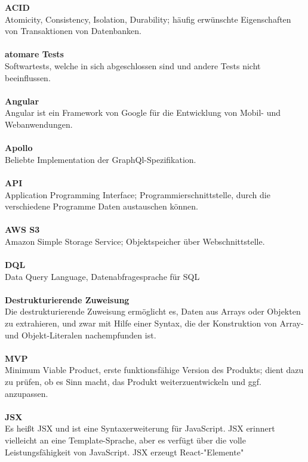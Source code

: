 \textbf{ACID}\\
Atomicity, Consistency, Isolation, Durability; häufig erwünschte Eigenschaften von Transaktionen von Datenbanken.
\\\\
\textbf{atomare Tests}\\
Softwartests, welche in sich abgeschlossen sind und andere Tests nicht beeinflussen.
\\\\
\textbf{Angular}\\
Angular ist ein Framework von Google für die Entwicklung von Mobil- und Webanwendungen.
\\\\
\textbf{Apollo}\\
Beliebte Implementation der GraphQl-Spezifikation.
\\\\
\textbf{API}\\
Application Programming Interface; Programmierschnittstelle, durch die verschiedene Programme Daten austauschen können.
\\\\
\textbf{AWS S3}\\
Amazon Simple Storage Service; Objektspeicher über Webschnittstelle.
\\\\
\textbf{DQL}\\
Data Query Language, Datenabfragesprache für SQL
\\\\
\textbf{Destrukturierende Zuweisung}\\
Die destrukturierende Zuweisung ermöglicht es, Daten aus Arrays oder Objekten zu extrahieren, und zwar mit Hilfe einer Syntax, die der Konstruktion von Array- und Objekt-Literalen nachempfunden ist.
\\\\
\textbf{MVP}\\
Minimum Viable Product, erste funktionsfähige Version des Produkts; dient dazu zu prüfen, ob es Sinn macht, das Produkt weiterzuentwickeln und ggf. anzupassen.
\\\\
\textbf{JSX}\\
Es heißt JSX und ist eine Syntaxerweiterung für JavaScript. JSX erinnert vielleicht an eine Template-Sprache, aber es verfügt über die volle Leistungsfähigkeit von JavaScript. JSX erzeugt React-"Elemente"

